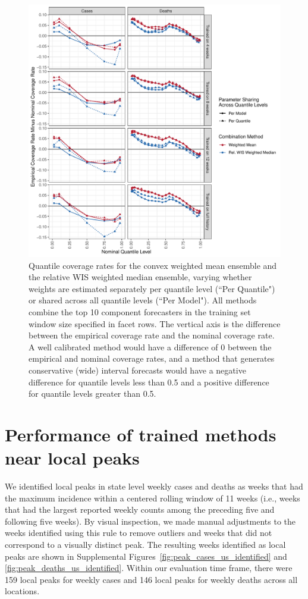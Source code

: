 \documentclass{article}
\begin{document}
\begin{figure}
  \includegraphics[width=\textwidth]{figures/quantile_coverage_quantile_group.pdf}
  \caption{Quantile coverage rates for the convex weighted mean ensemble and the relative WIS weighted median ensemble, varying whether weights are estimated separately per quantile level (``Per Quantile") or shared across all quantile levels (``Per Model"). All methods combine the top 10 component forecasters in the training set window size specified in facet rows. The vertical axis is the difference between the empirical coverage rate and the nominal coverage rate. A well calibrated method would have a difference of 0 between the empirical and nominal coverage rates, and a method that generates conservative (wide) interval forecasts would have a negative difference for quantile levels less than 0.5 and a positive difference for quantile levels greater than 0.5.}
  \label{fig:coverage_quantile_grouping}
\end{figure}

\newpage

\section{Performance of trained methods near local peaks}

We identified local peaks in state level weekly cases and deaths as weeks that had the maximum incidence within a centered rolling window of 11 weeks (i.e., weeks that had the largest reported weekly counts among the preceding five and following five weeks). By visual inspection, we made manual adjustments to the weeks identified using this rule to remove outliers and weeks that did not correspond to a visually distinct peak. The resulting weeks identified as local peaks are shown in Supplemental Figures~\ref{fig:peak_cases_us_identified} and \ref{fig:peak_deaths_us_identified}. Within our evaluation time frame, there were 159 local peaks for weekly cases and 146 local peaks for weekly deaths across all locations.
\end{document}
